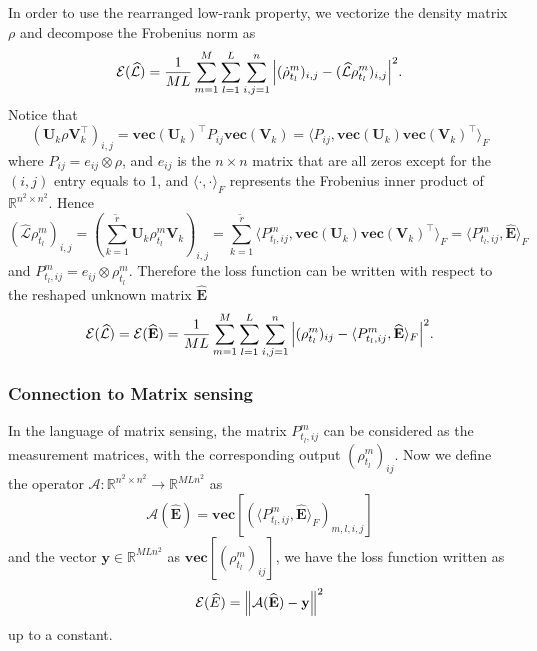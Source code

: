 \documentclass[10pt]{article}  %
\theoremstyle{plain}
\numberwithin{equation}{section}
\newcommand{\innerp}[1]{\langle{#1}\rangle}
\def\mL{\mathcal{L}}
\def\mE{\mathcal{E}}
\def\mA{\mathcal{A}}
\def\R{\mathbb{R}}
\newcommand{\bV}{\mathbf{V}}
\newcommand{\bU}{\mathbf{U}}
\newcommand{\bE}{\mathbf{E}}
\newcommand{\by}{\mathbf{y}}
\renewcommand{\vec}{\textbf{vec}}
\renewcommand{\R}{\mathbb{R}}
\begin{document}
In order to use the rearranged low-rank property, we vectorize the density matrix $\rho$ and decompose the Frobenius norm as 
\begin{equation}
	\mE(\widehat{\mL}) = \frac{1}{ML}\sum_{m = 1}^M\sum_{l = 1}^L\sum_{i, j = 1}^n \abs{(\dot{\rho}^{m}_{t_l})_{i, j } - (\widehat{\mL}\rho^m_{t_l})_{i, j}}^2.
\end{equation}
Notice that 
\begin{equation}
	(\bU_k\rho \bV_k^\top)_{i, j} = \vec(\bU_k)^\top P_{ij} \vec(\bV_k) = \innerp{P_{ij}, \vec(\bU_k)\vec(\bV_k)^\top}_F
\end{equation}
where $P_{ij} = e_{ij} \otimes \rho$, and $e_{ij}$ is the $n\times n$ matrix that are all zeros except for the $(i, j)$ entry equals to 1, and $\innerp{\cdot, \cdot}_F$ represents the Frobenius inner product of $\R^{n^2\times n^2}$. Hence 
\begin{equation}
	(\widehat{\mL}\rho^m_{t_l})_{i, j} = \left(\sum_{k = 1}^{\widetilde{r}}\bU_k\rho^m_{t_l}\bV_k\right)_{i, j} = \sum_{k = 1}^{\widetilde{r}}\innerp{P^m_{t_l, ij}, \vec(\bU_k)\vec(\bV_k)^\top}_F = \innerp{P^m_{t_l, ij}, \widehat{\bE}}_F
\end{equation}
and $P^m_{t_l, ij} = e_{ij}\otimes \rho^m_{t_l}$.
Therefore the loss function can be written with respect to the reshaped unknown matrix $\widehat{\bE}$
\begin{equation}
	\mE(\widehat{\mL}) = \mE(\widehat{\bE}) = \frac{1}{ML}\sum_{m = 1}^M\sum_{l = 1}^L\sum_{i, j = 1}^n \abs{(\rho^m_{t_l})_{ij} - \innerp{P^m_{t_l, ij}, \widehat{\bE}}_F}^2.
\end{equation}

\subsubsection{Connection to Matrix sensing}
In the language of matrix sensing, the matrix $P^m_{t_l, ij}$ can be considered as the measurement matrices, with the corresponding output $(\rho^m_{t_l})_{ij}$. Now we define the operator $\mA : \R^{n^2\times n^2}\to \R^{MLn^2}$ as
\begin{equation}
	\mA(\widehat{\bE}) = \vec\left[(\innerp{P^m_{t_l, ij}, \widehat{\bE}}_F)_{m, l, i, j}\right]
\end{equation}
and the vector $\by\in \R^{MLn^2}$ as $\vec\left[(\rho^m_{t_l})_{ij}\right]$, we have the loss function written as 
\begin{equation}
	\mE(\widehat{E}) = \norm{\mA(\widehat{\bE}) - \by}^2
\end{equation}
up to a constant. 
\end{document}
